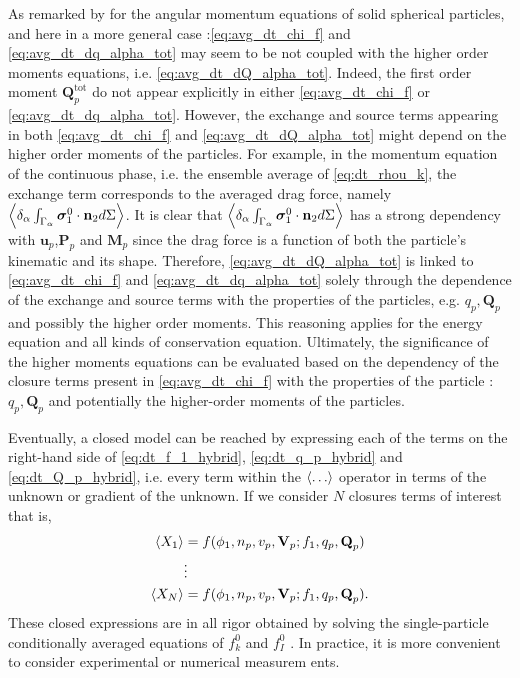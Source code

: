As remarked by \citet{jackson1997locally} for the angular momentum equations of solid spherical particles, and here in a more general case :\ref{eq:avg_dt_chi_f} and \ref{eq:avg_dt_dq_alpha_tot} may seem to be not coupled with the higher order moments equations, i.e. \ref{eq:avg_dt_dQ_alpha_tot}. 
Indeed, the first order moment $\textbf{Q}_p^\text{tot}$ do not appear explicitly in either \ref{eq:avg_dt_chi_f} or \ref{eq:avg_dt_dq_alpha_tot}.
However, the exchange and source terms 
appearing in both \ref{eq:avg_dt_chi_f} and \ref{eq:avg_dt_dQ_alpha_tot} might depend on the higher order moments of the particles.
For example, in the momentum equation of the continuous phase, i.e. the ensemble average of \ref{eq:dt_rhou_k}, the exchange term corresponds to the averaged drag force, namely $\left<\delta_\alpha \int_{\Gamma_\alpha} \bm{\sigma}_1^0\cdot \textbf{n}_2 d\Sigma\right>$. 
It is clear that $\left<\delta_\alpha \int_{\Gamma_\alpha} \bm{\sigma}_1^0\cdot \textbf{n}_2 d\Sigma\right>$ has a strong dependency with $\textbf{u}_p$,$\textbf{P}_p$ and $\textbf{M}_p$ since the drag force is a function of both the particle's kinematic and its shape. 
Therefore, \ref{eq:avg_dt_dQ_alpha_tot} is linked to \ref{eq:avg_dt_chi_f} and \ref{eq:avg_dt_dq_alpha_tot} solely through the dependence of the exchange and source terms with the properties of the particles, e.g. $q_p,\textbf{Q}_p$ and possibly the higher order moments. 
This reasoning applies for the energy equation and all kinds of conservation equation. 
Ultimately, the significance of the higher moments equations can be evaluated based on the dependency of the closure terms present in \ref{eq:avg_dt_chi_f} with the properties of the particle : $q_p, \textbf{Q}_p$ and potentially the higher-order moments of the particles.


Eventually, a closed model can be reached by expressing each of the terms on the right-hand side of \ref{eq:dt_f_1_hybrid}, \ref{eq:dt_q_p_hybrid} and \ref{eq:dt_Q_p_hybrid}, i.e. every term within the $\left<\ldots\right>$ operator in terms of the unknown or gradient of the unknown.
If we consider $N$ closures terms of interest that is, 
\begin{align*}
    \left<X_1\right> &=  f(\phi_1,n_p,v_p,\textbf{V}_p; f_1,q_p,\textbf{Q}_p)\\
    &\vdots\\
    \left<X_N\right> &=  f(\phi_1,n_p,v_p,\textbf{V}_p; f_1,q_p,\textbf{Q}_p). \\
\end{align*}
These closed expressions are in all rigor obtained by solving the single-particle conditionally averaged equations of $f_k^0$ and $f_I^0$ \citet{hinch1977averaged,zhang1994ensemble}.
In practice, it is more convenient to consider experimental or numerical measurem ents.  

